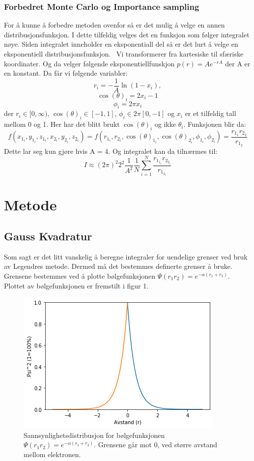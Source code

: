 \documentclass[%
oneside,                 %
final,                   %
10pt]{article}
\begin{document}
\subsubsection{Forbedret Monte Carlo og Importance sampling}
For å kunne å forbedre metoden ovenfor så er det mulig å velge en annen distribusjonsfunksjon. I dette tilfeldig velges det en funksjon som følger integralet nøye. Siden integralet inneholder en eksponentiall del så er det lurt å velge en eksponentiell distribusjonsfunksjon.
\
\noindent Vi transformerer fra kartesiske til sfæriske koordinater. Og da velger følgende eksponentiellfunskjon $p(r) = Ae^{-rA}$ der A er en konstant. Da får vi følgende variabler:
$$r_i = -\frac{1}{A}\ln(1-x_i), $$
$$\cos(\theta)_i = 2x_i -1 $$
$$\phi_i = 2\pi x_i$$
der $r_i \in [0,\infty)$, $\cos(\theta)_i \in [-1,1]$, $\phi_i \in 2\pi[0,-1]$ og $x_i$ er et tilfeldig tall mellom 0 og 1. Her har det blitt brukt $\cos(\theta)_i$ og ikke $\theta_i$. Funksjonen blir da:
$$f(x_1_i,y_1_i,z_1_i,x_2_i,y_2_i,z_2_i) = f(r_1_i,r_2_i,\cos(\theta)_1_i,\cos(\theta)_2_i,\phi_1_i,\phi_2_i) = \frac{r_1_1 r_2_2}{r_1_2}$$
Dette lar seg kun gjøre hvis A = 4. Og integralet kan da tilnærmes til:
\begin{equation}
I \approx (2\pi)^2 2^2 \frac{1}{A^2}  \frac{1}{N} \sum_{i=1}^{N} \frac{r_1_1_i r_2_2_i}{r_1_2_i}
\end{equation}





\section{Metode}
\subsection{Gauss Kvadratur}
\noindent Som sagt er det litt vanskelig å beregne integraler for uendelige grenser ved bruk av Legendres metode. Dermed må det bestemmes definerte grenser å bruke. Grensene bestemmes ved å plotte bølgefunksjonen $\Psi(r_1r_2)=e^{-\alpha(r_1+r_2)}$. Plottet av bølgefunksjonen er fremstilt i figur 1.

\begin{figure}[H]
\centering
\includegraphics[scale=0.8]{plottbestemmegrenser.png}
\caption{Sannsynlighetsdistribusjon for bølgefunksjonen $\Psi(r_1r_2)=e^{-\alpha(r_1+r_2)}$. Grensene går mot 0, ved større avstand mellom elektronen.}
\label{fig: Grenser}
\end{figure}
\end{document}
